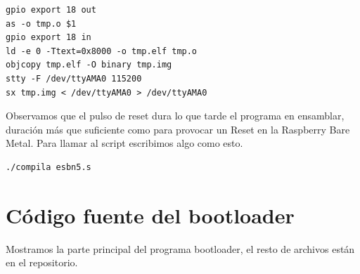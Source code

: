 \begin{lstlisting}
gpio export 18 out
as -o tmp.o $1
gpio export 18 in
ld -e 0 -Ttext=0x8000 -o tmp.elf tmp.o
objcopy tmp.elf -O binary tmp.img
stty -F /dev/ttyAMA0 115200
sx tmp.img < /dev/ttyAMA0 > /dev/ttyAMA0
\end{lstlisting}

Observamos que el pulso de reset dura lo que tarde el programa en ensamblar, duración
más que suficiente como para provocar un Reset en la Raspberry Bare Metal. Para llamar
al script escribimos algo como esto.

\begin{lstlisting}
./compila esbn5.s
\end{lstlisting}

\section{Código fuente del bootloader}

Mostramos la parte principal del programa bootloader, el resto de archivos están
en el repositorio.

